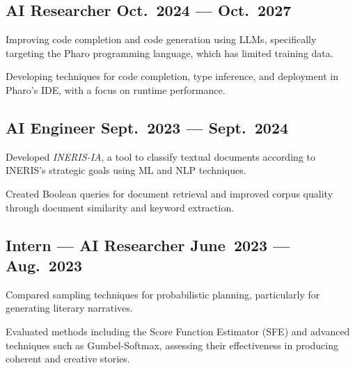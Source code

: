 \subsection{{AI Researcher \hfill Oct.\ 2024 --- Oct.\ 2027}}
\begin{zitemize}
    \item Improving code completion and code generation using LLMs, specifically targeting the Pharo programming language, which has limited training data.
    \item Developing techniques for code completion, type inference, and deployment in Pharo’s IDE, with a focus on runtime performance.
\end{zitemize}

\subsection{{AI Engineer \hfill Sept.\ 2023 --- Sept.\ 2024}}
\begin{zitemize}
    \item Developed \textit{INERIS-IA}, a tool to classify textual documents according to INERIS’s strategic goals using ML and NLP techniques.
    \item Created Boolean queries for document retrieval and improved corpus quality through document similarity and keyword extraction.
\end{zitemize}

\subsection{{Intern --- AI Researcher \hfill June\ 2023 --- Aug.\ 2023}}
\begin{zitemize}
    \item Compared sampling techniques for probabilistic planning, particularly for generating literary narratives.
    \item Evaluated methods including the Score Function Estimator (SFE) and advanced techniques such as Gumbel-Softmax, assessing their effectiveness in producing coherent and creative stories.
\end{zitemize}